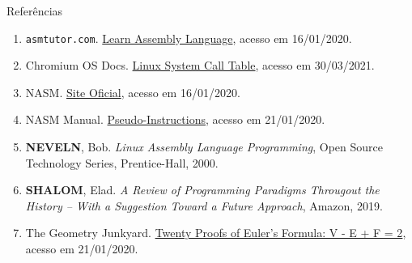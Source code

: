 \begin{frame}[fragile]{Referências}

    \begin{enumerate}
        \item \texttt{asmtutor.com}. \href{https://asmtutor.com/#lesson1}{Learn Assembly Language},
            acesso em 16/01/2020.
  
        \item Chromium OS Docs. \href{https://chromium.googlesource.com/chromiumos/docs/+/master/constants/syscalls.md#x86-32_bit}{Linux System Call Table}, acesso em 30/03/2021.

        \item NASM. \href{https://www.nasm.us/}{Site Oficial}, acesso em 16/01/2020.
 
        \item NASM Manual. \href{https://www.nasm.us/xdoc/2.09.04/html/nasmdoc3.html#section-3.2}{Pseudo-Instructions}, acesso em 21/01/2020.
 
        \item \textbf{NEVELN}, Bob. \textit{Linux Assembly Language Programming}, Open Source
            Technology Series, Prentice-Hall, 2000.

        \item \textbf{SHALOM}, Elad. \textit{A Review of Programming Paradigms Througout the 
            History -- With a Suggestion Toward a Future Approach}, Amazon, 2019.

        \item The Geometry Junkyard. \href{https://www.ics.uci.edu/~eppstein/junkyard/euler/}{Twenty Proofs of Euler's Formula: V - E + F = 2}, acesso em 21/01/2020. 

    \end{enumerate}

\end{frame}

